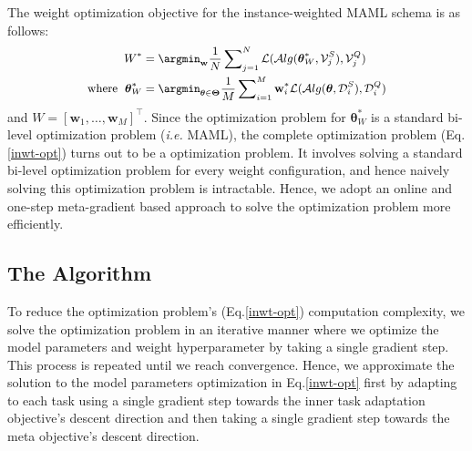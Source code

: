 The weight optimization objective for the instance-weighted MAML schema is as follows:
\begin{equation}
\small
    \begin{aligned}
    \label{inwt-opt}
     {W}^{*} &= \argmin_{\mathbf{w}} \frac{1}{N} \sum\nolimits_{j=1}^{N}\mathcal{L}(\mathcal{A}lg(\boldsymbol{\theta}^{*}_{W}, \mathcal{V}_{j}^{S}), \mathcal{V}_{j}^{Q}) 
     \\
    \text{where\hspace{2mm}} \boldsymbol{\theta}^{*}_{W} &= \argmin_{\boldsymbol{\theta} \in \boldsymbol{\Theta}} \frac{1}{M}\sum\nolimits_{i=1}^{M}\mathbf{w}_{i}^{*}\mathcal{L}(\mathcal{A}lg(\boldsymbol{\theta}, \mathcal{D}_i^{S}), \mathcal{D}_i^{Q})
    \end{aligned}
\end{equation}
and ${W}=[\mathbf{w}_1,\dots,\mathbf{w}_M]^{\intercal}$. Since the optimization problem for $\boldsymbol{\theta}_{W}^*$ is a standard bi-level optimization problem (\textit{i.e.} MAML), the complete optimization problem (Eq.\eqref{inwt-opt}) turns out to be a \textbf{\biopt{}} optimization problem. It involves solving a standard bi-level optimization problem for every weight configuration, and hence naively solving this \textbf{\biopt{}} optimization problem is intractable. Hence, we adopt an online and one-step meta-gradient based approach to solve the optimization problem more efficiently. 

\vspace{-1ex}
\subsection{The \sysname{} Algorithm}
To reduce the optimization problem's {(Eq.\eqref{inwt-opt})} computation complexity, we solve the optimization problem in an iterative manner where we optimize the model parameters and weight hyperparameter by taking a single gradient step. This process is repeated until we reach convergence. Hence, we approximate the solution to the model parameters optimization in Eq.\eqref{inwt-opt} first by adapting to each task using a single gradient step towards the inner task adaptation objective's descent direction and then taking a single gradient step towards the meta objective's descent direction. 

